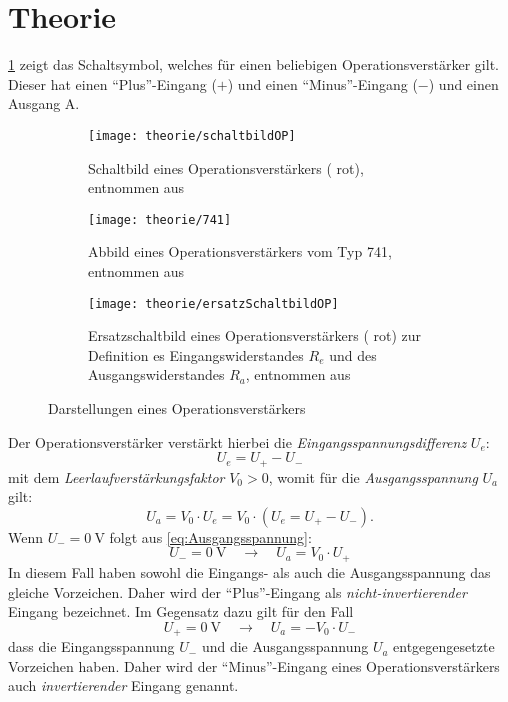 \part{Theorie}
\cref{fig:Einleitung/SchaltbildOperationsverstärker} zeigt das Schaltsymbol, 
welches für einen beliebigen Operationsverstärker gilt. Dieser hat einen 
"`Plus"'-Eingang ($+$) und einen "`Minus"'-Eingang ($-$) und einen Ausgang A.

\begin{figure}[H]
	\centering
	\begin{subfigure}[t]{0.3\linewidth}
		\centering
		\texttt{[image: theorie/schaltbildOP]}
		\caption{Schaltbild eines Operationsverstärkers ({\color{red} rot}), 
		entnommen aus \cite{script}}
		\label{fig:Einleitung/SchaltbildOperationsverstärker}
	\end{subfigure}
	\quad
	\begin{subfigure}[t]{0.2\linewidth}
		\centering
		\texttt{[image: theorie/741]}
		\caption{Abbild eines Operationsverstärkers vom Typ 741, entnommen aus 
		\cite{image741}}
		\label{fig:Einleitung/Operationsverstärker}
	\end{subfigure}
	\quad
	\begin{subfigure}[t]{0.3\linewidth}
		\centering
		\texttt{[image: theorie/ersatzSchaltbildOP]}
		\caption{Ersatzschaltbild eines Operationsverstärkers ({\color{red} 
		rot}) zur Definition es Eingangswiderstandes $R_e$ und des 
		Ausgangswiderstandes $R_a$, entnommen aus \cite{script}}
		\label{fig:Einleitung/ErsatzschaltbildOperationsverstärker}
	\end{subfigure}
	\caption{Darstellungen eines Operationsverstärkers}
\end{figure}

Der Operationsverstärker verstärkt hierbei die 
\textsl{Eingangsspannungsdifferenz} $U_e$:
\begin{equation}\label{eq:Eingangsspannungsdifferenz}
	U_e = U_+ - U_-
\end{equation}
mit dem \textsl{Leerlaufverstärkungsfaktor} $V_0 > 0$, womit für die 
\textsl{Ausgangsspannung} $U_a$ gilt:
\begin{equation}\label{eq:Ausgangsspannung}
	U_a = V_0 \cdot U_e = V_0 \cdot \left(U_e = U_+ - U_-\right).
\end{equation}
Wenn $U_- = \qty{0}{\V}$ folgt aus \cref{eq:Ausgangsspannung}:
\begin{equation}
	U_- = \qty{0}{\V} \quad \rightarrow \quad U_a = V_0 \cdot U_+
\end{equation}
In diesem Fall haben sowohl die Eingangs- als auch die Ausgangsspannung das 
gleiche Vorzeichen. Daher wird der "`Plus"'-Eingang als 
\textsl{nicht-invertierender} Eingang bezeichnet. Im Gegensatz dazu gilt für 
den Fall
\begin{equation}
	U_+ = \qty{0}{\V} \quad \rightarrow \quad U_a = -V_0 \cdot U_-
\end{equation}
dass die Eingangsspannung $U_-$ und die Ausgangsspannung $U_a$ entgegengesetzte 
Vorzeichen haben. Daher wird der "`Minus"'-Eingang eines Operationsverstärkers 
auch \textsl{invertierender} Eingang genannt.

